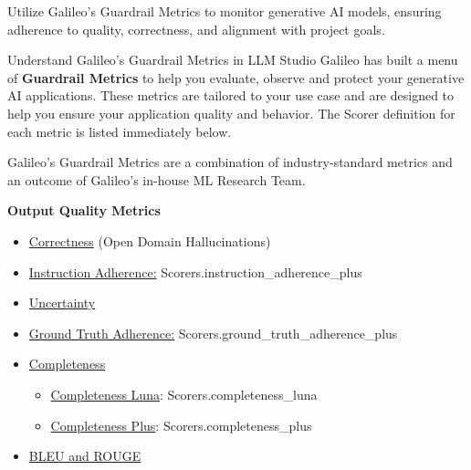 \documentclass[
  letterpaper,
  DIV=11,
  numbers=noendperiod,
  oneside]{scrreprt}
\begin{document}
\begin{tcolorbox}
Utilize Galileo's Guardrail Metrics to monitor generative AI models,
ensuring adherence to quality, correctness, and alignment with project
goals.

Understand Galileo's Guardrail Metrics in LLM Studio Galileo has built a
menu of \textbf{Guardrail Metrics} to help you evaluate, observe and
protect your generative AI applications. These metrics are tailored to
your use case and are designed to help you ensure your application
quality and behavior. The Scorer definition for each metric is listed
immediately below.

Galileo's Guardrail Metrics are a combination of industry-standard
metrics and an outcome of Galileo's in-house ML Research Team.

\textbf{Output Quality Metrics}

\begin{itemize}
\item
  \href{https://docs.galileo.ai/galileo/gen-ai-studio-products/galileo-guardrail-metrics/correctness}{Correctness}
  (Open Domain Hallucinations)
\item
  \href{https://docs.galileo.ai/galileo/gen-ai-studio-products/galileo-guardrail-metrics/instruction-adherence}{Instruction
  Adherence:} Scorers.instruction\_adherence\_plus
\item
  \href{https://docs.galileo.ai/galileo/gen-ai-studio-products/galileo-guardrail-metrics/uncertainty}{Uncertainty}
\item
  \href{https://docs.galileo.ai/galileo/gen-ai-studio-products/galileo-guardrail-metrics/ground-truth-adherence}{Ground
  Truth Adherence:} Scorers.ground\_truth\_adherence\_plus
\item
  \href{https://docs.galileo.ai/galileo/gen-ai-studio-products/galileo-guardrail-metrics/completeness/completeness-plus}{Completeness}

  \begin{itemize}
  \item
    \href{https://docs.galileo.ai/galileo/gen-ai-studio-products/galileo-guardrail-metrics/completeness/completeness-luna}{Completeness
    Luna}: Scorers.completeness\_luna
  \item
    \href{https://docs.galileo.ai/galileo/gen-ai-studio-products/galileo-guardrail-metrics/completeness/completeness-plus}{Completeness
    Plus}: Scorers.completeness\_plus
  \end{itemize}
\item
  \href{https://docs.galileo.ai/galileo/gen-ai-studio-products/galileo-guardrail-metrics/bleu-and-rouge-1}{BLEU
  and ROUGE}
\end{itemize}


\end{tcolorbox}
\end{document}

